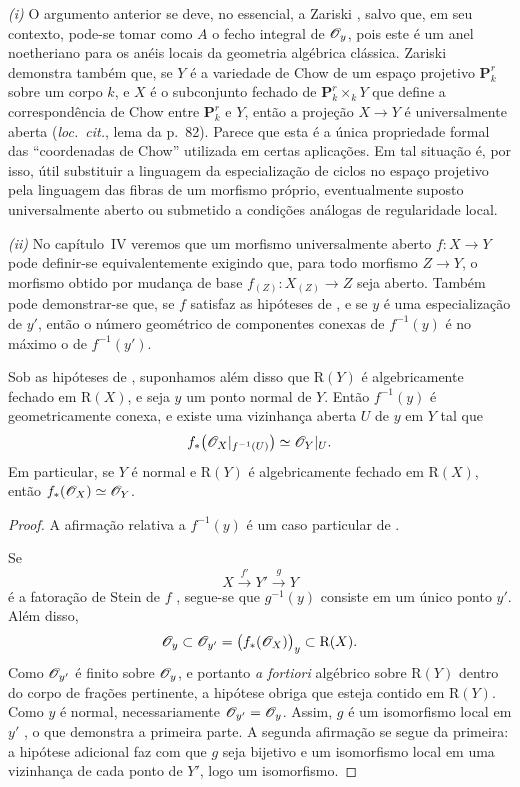 \begin{remark}[4.3.11]
\label{III.4.3.11}
\emph{(i)}
O argumento anterior se deve, no essencial, a Zariski
\cite{I-20}, salvo que, em seu contexto, pode-se tomar como $A$ o
fecho integral de $\mathscr{O}_y$, pois este é um anel noetheriano para
os anéis locais da geometria algébrica clássica. Zariski
demonstra também que, se $Y$ é a variedade de Chow de um espaço
projetivo $\mathbf{P}_k^r$ sobre um corpo $k$, e $X$ é o
subconjunto fechado de $\mathbf{P}_k^r\times_kY$ que define a
correspondência de Chow entre $\mathbf{P}_k^r$ e $Y$, então a
projeção $X\to Y$ é universalmente aberta (\emph{loc.\ cit.},
lema da p.~82).
Parece que esta é a única propriedade formal das ``coordenadas de
Chow'' utilizada em certas aplicações. Em tal situação é, por
isso, útil substituir a linguagem da especialização de ciclos no
espaço projetivo pela linguagem das fibras de um morfismo próprio,
eventualmente suposto universalmente aberto ou submetido a condições
análogas de regularidade local.

\emph{(ii)}
No capítulo~IV veremos que um morfismo universalmente aberto
$f:X\to Y$ pode definir-se equivalentemente exigindo que, para todo
morfismo $Z\to Y$, o morfismo obtido por mudança de base
$f_{(Z)}:X_{(Z)}\to Z$ seja aberto. Também pode demonstrar-se que, se
$f$ satisfaz as hipóteses de , e se $y$ é uma
especialização de $y'$, então o número geométrico de componentes
conexas de $f^{-1}(y)$ é no máximo o de $f^{-1}(y')$.
\end{remark}

\begin{corollary}[4.3.12]
\label{III.4.3.12}
Sob as hipóteses de , suponhamos além disso que
$\mathrm{R}(Y)$ é algebricamente fechado em $\mathrm{R}(X)$, e seja
$y$ um ponto normal de $Y$. Então $f^{-1}(y)$ é geometricamente
conexa, e existe uma vizinhança aberta $U$ de $y$ em $Y$ tal que
\[
  f_*\bigl(\mathscr{O}_X|_{f^{-1}(U)}\bigr)
  \simeq
  \mathscr{O}_Y|_U.
\]
Em particular, se $Y$ é normal e $\mathrm{R}(Y)$ é algebricamente
fechado em $\mathrm{R}(X)$, então
$f_*(\mathscr{O}_X)\simeq\mathscr{O}_Y$.
\end{corollary}

\begin{proof}
A afirmação relativa a $f^{-1}(y)$ é um caso particular de
.


Se
\[
  X\xrightarrow{f'}Y'\xrightarrow{g}Y
\]
é a fatoração de Stein de $f$ , segue-se que
$g^{-1}(y)$ consiste em um único ponto $y'$. Além disso,
\[
  \mathscr{O}_y
  \subset
  \mathscr{O}_{y'}
  =
  \bigl(f_*(\mathscr{O}_X)\bigr)_y
  \subset
  \mathrm{R}(X).
\]
Como $\mathscr{O}_{y'}$ é finito sobre $\mathscr{O}_y$, e portanto
\emph{a fortiori} algébrico sobre $\mathrm{R}(Y)$ dentro do corpo
de frações pertinente, a hipótese obriga que esteja contido em
$\mathrm{R}(Y)$. Como $y$ é normal, necessariamente
$\mathscr{O}_{y'}=\mathscr{O}_y$. Assim, $g$ é um isomorfismo local em $y'$
, o que demonstra a primeira parte. A segunda
afirmação se segue da primeira: a hipótese adicional faz com que $g$
seja bijetivo e um isomorfismo local em uma vizinhança de cada ponto de
$Y'$, logo um isomorfismo.
\end{proof}

